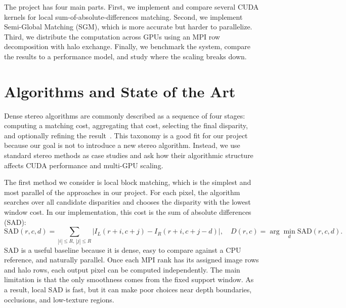 \documentclass[11pt]{article}
\begin{document}
The project has four main parts. First, we implement and compare several CUDA kernels for local sum-of-absolute-differences matching. Second, we implement Semi-Global Matching (SGM), which is more accurate but harder to parallelize. Third, we distribute the computation across GPUs using an MPI row decomposition with halo exchange. Finally, we benchmark the system, compare the results to a performance model, and study where the scaling breaks down.

\section{Algorithms and State of the Art}

Dense stereo algorithms are commonly described as a sequence of four stages:
computing a matching cost, aggregating that cost, selecting the final disparity,
and optionally refining the result~\cite{scharstein2002}. This taxonomy is a
good fit for our project because our goal is not to introduce a new stereo
algorithm. Instead, we use standard stereo methods as case studies and ask how
their algorithmic structure affects CUDA performance and multi-GPU scaling.

The first method we consider is local block matching, which is the simplest and
most parallel of the approaches in our project. For each pixel, the algorithm
searches over all candidate disparities and chooses the disparity with the lowest
window cost. In our implementation, this cost is the sum of absolute differences
(SAD):
\begin{equation}
\label{eq:sad}
\mathrm{SAD}(r,c,d) =
\sum_{|i|\le R,\,|j|\le R}
\left| I_L(r+i,c+j)-I_R(r+i,c+j-d)\right|,
\quad
D(r,c)=\arg\min_d \mathrm{SAD}(r,c,d).
\end{equation}
SAD is a useful baseline because it is dense, easy to compare against a CPU
reference, and naturally parallel. Once each MPI rank has its assigned image
rows and halo rows, each output pixel can be computed independently. The main
limitation is that the only smoothness comes from the fixed support window. As a
result, local SAD is fast, but it can make poor choices near depth boundaries,
occlusions, and low-texture regions.
\end{document}

